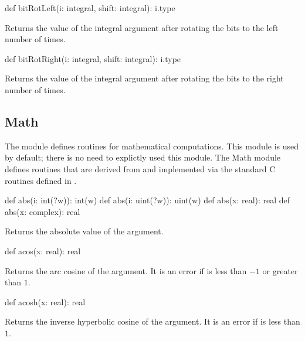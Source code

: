 \begin{protohead}
def bitRotLeft(i: integral, shift: integral): i.type
\end{protohead}
\begin{protobody}
Returns the value of the integral argument  after rotating the
bits to the left  number of times.
\end{protobody}

\begin{protohead}
def bitRotRight(i: integral, shift: integral): i.type
\end{protohead}
\begin{protobody}
Returns the value of the integral argument  after rotating the
bits to the right  number of times.
\end{protobody}

\subsection{Math}
\label{Math}

The module  defines routines for mathematical computations.
This module is used by default; there is no need to explictly used
this module.  The Math module defines routines that are derived from
and implemented via the standard C routines defined in .

\vspace{1pc}

\begin{protohead}
def abs(i: int(?w)): int(w)
def abs(i: uint(?w)): uint(w)
def abs(x: real): real
def abs(x: complex): real
\end{protohead}
\begin{protobody}
Returns the absolute value of the argument.
\end{protobody}

\begin{protohead}
def acos(x: real): real
\end{protohead}
\begin{protobody}
Returns the arc cosine of the argument.  It is an error if  is
less than $-1$ or greater than $1$.
\end{protobody}

\begin{protohead}
def acosh(x: real): real
\end{protohead}
\begin{protobody}
Returns the inverse hyperbolic cosine of the argument.  It is an error
if  is less than $1$.
\end{protobody}


